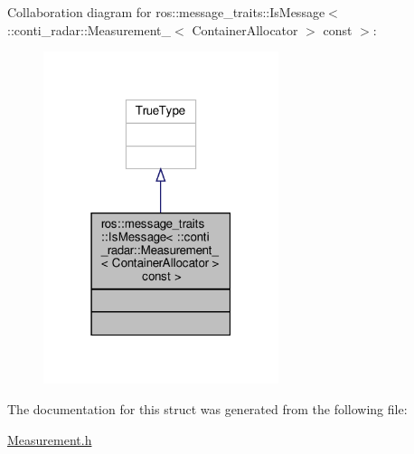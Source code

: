 Collaboration diagram for ros\+:\+:message\+\_\+traits\+:\+:Is\+Message$<$ \+:\+:conti\+\_\+radar\+:\+:Measurement\+\_\+$<$ Container\+Allocator $>$ const $>$\+:\nopagebreak
\begin{figure}[H]
\begin{center}
\leavevmode
\includegraphics[width=195pt]{df/d7e/structros_1_1message__traits_1_1IsMessage_3_01_1_1conti__radar_1_1Measurement___3_01ContainerAllf72b565339fcbffbed107431c93d66ac}
\end{center}
\end{figure}


The documentation for this struct was generated from the following file\+:\begin{DoxyCompactItemize}
\item 
\hyperlink{Measurement_8h}{Measurement.\+h}\end{DoxyCompactItemize}
